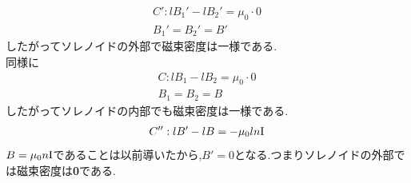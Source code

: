 \documentclass[../main]{subfiles}
\begin{document}
\begin{eqnarray*}
C': lB_1'-lB_2'=\mu_0 \cdot 0 \\
B_1'=B_2'=B'
\end{eqnarray*}
したがってソレノイドの外部で磁束密度は一様である.　\\
同様に
\begin{eqnarray*}
C: lB_1-lB_2=\mu_0 \cdot 0 \\
B_1=B_2=B
\end{eqnarray*}
したがってソレノイドの内部でも磁束密度は一様である. \\
\begin{eqnarray*}
C'':lB'-lB=-\mu_0 l n {\rm I} \\
\end{eqnarray*}
$B=\mu_0n{\rm I}$であることは以前導いたから,$B'=0$となる.つまりソレノイドの外部では磁束密度は{\bf 0}である.
\end{document}
